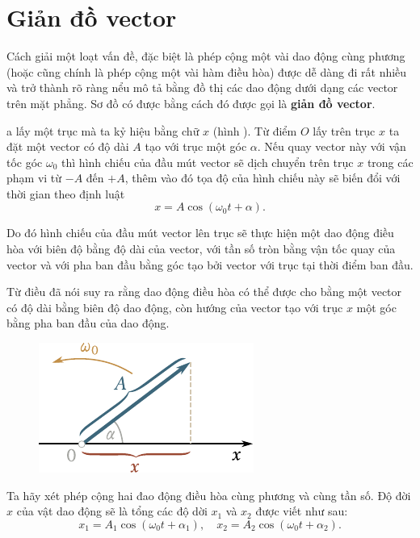 \section{Giản đồ vector}\label{sec:7_7}

Cách giải một loạt vấn đề, đặc biệt là phép cộng một vài dao động cùng phương (hoặc cũng chính là phép cộng một vài hàm điều hòa) được dễ dàng đi rất nhiều và trở thành rõ ràng nểu mô tả bằng đồ thị các dao động dưới dạng các vector trên mặt phẳng. Sơ đồ có được bằng cách đó được gọi là \textbf{giản đồ vector}.

a lấy một trục mà ta kỷ hiệu bằng chữ $x$ (hình ). Từ điểm $O$ lấy trên trục $x$ ta đặt một vector có độ dài $A$ tạo với trục một góc $\alpha$. Nếu quay vector này với vận tốc góc $\omega_0$ thì hình chiếu của đầu mút vector sẽ dịch chuyển trên trục $x$ trong các phạm vi từ $-A$ đến $+A$, thêm vào đó tọa độ của hình chiếu này sẽ biến đổi với thời gian theo định luật
\begin{equation*}
	x = A\cos(\omega_0 t + \alpha).
\end{equation*}

\noindent
Do đó hình chiếu của đầu mút vector lên trục sẽ thực hiện một dao động điều hòa với biên độ bằng độ dài của vector, với tần số tròn bằng vận tốc quay của vector và với pha ban đầu bằng góc tạo bởi vector với trục tại thời điểm ban đầu.

Từ điều đã nói suy ra rằng dao động điều hòa có thể được cho bằng một vector có độ dài bằng biên độ dao động, còn hướng của vector tạo với trục $x$ một góc bằng pha ban đầu của dao động.

\begin{figure}[!htb]
	\begin{center}
		\includegraphics[scale=0.95]{figures/ch_07/fig_7_9.pdf}
		\caption[]{}
		\label{fig:7_9}
	\end{center}
\end{figure}

Ta hãy xét phép cộng hai đao động điều hòa cùng phương và cùng tần số. Độ đời $x$ của vật dao động sẽ là tổng các độ dời $x_1$ và $x_2$ được viết như sau:
\begin{equation}\label{eq:7_83}
	x_1 = A_1\cos(\omega_0 t + \alpha_1),\quad x_2 = A_2\cos(\omega_0 t + \alpha_2).
\end{equation}

